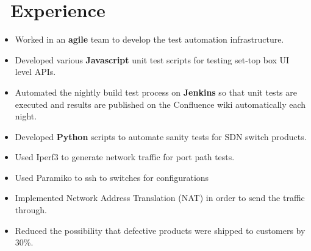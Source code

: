 \documentclass{resume}
\begin{document}
\section{\faCogs\ Experience}
\iffalse
\datedsubsection{\textbf{Carleton University}}{Ottawa, ON, Canada}
\role{Research and Teaching Assistant}{Sept. 2018 -- Aug. 2020}
\begin{itemize}
	\item Conducted research on Graph Convolutional Networks in Prof. Tony White's Complex Adaptive System lab.
	\item Led tutorials and laboratory sections. 
	\item Explained computer science concepts to students using examples and analogies. 
	\item Students who often attended my office hour improved their score by 10\% on average.  
\end{itemize}
\fi

\begin{itemize}
	\item Worked in an \textbf{agile} team to develop the test automation infrastructure.
	\item Developed various \textbf{Javascript} unit test scripts for testing set-top box UI level APIs.
	\item Automated the nightly build test process on \textbf{Jenkins} so that unit tests are executed and results are published on the Confluence wiki automatically each night.
\end{itemize}

\begin{itemize}
	\item Developed \textbf{Python} scripts to automate sanity tests for SDN switch products.
	\item Used Iperf3 to generate network traffic for port path tests.
	\item Used Paramiko to ssh to switches for configurations
	\item Implemented Network Address Translation (NAT) in order to send the traffic through.  
	\item Reduced the possibility that defective products were shipped to customers by 30\%.
\end{itemize}
\end{document}
